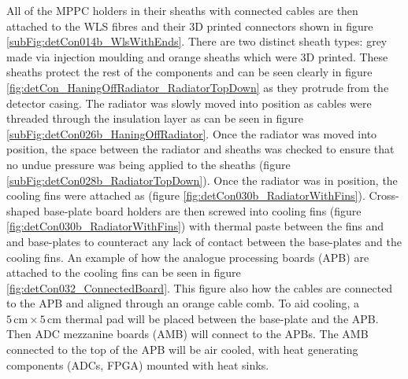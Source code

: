 
All of the MPPC holders in their sheaths with connected cables are then attached to the WLS fibres and their 3D printed connectors shown in figure \ref{subFig:detCon014b_WlsWithEnds}. There are two distinct sheath types: grey made via injection moulding and orange sheaths which were 3D printed. These sheaths protect the rest of the components and can be seen clearly in figure \ref{fig:detCon_HaningOffRadiator_RadiatorTopDown} as they protrude from the detector casing. The radiator was slowly moved into position as cables were threaded through the insulation layer as can be seen in figure \ref{subFig:detCon026b_HaningOffRadiator}. Once the radiator was moved into position, the space between the radiator and sheaths was checked to ensure that no undue pressure was being applied to the sheaths (figure \ref{subFig:detCon028b_RadiatorTopDown}). Once the radiator was in position, the cooling fins were  attached as (figure \ref{fig:detCon030b_RadiatorWithFins}). Cross-shaped base-plate board holders are then screwed into cooling fins (figure \ref{fig:detCon030b_RadiatorWithFins}) with thermal paste between the fins and and base-plates to counteract any lack of contact between the base-plates and the cooling fins. An example of how the analogue processing boards (APB) are attached to the cooling fins can be seen in figure \ref{fig:detCon032_ConnectedBoard}. This figure also how the cables are connected to the APB and aligned through an orange cable comb. To aid cooling, a $5\,\textrm{cm}\times5\,\textrm{cm}$ thermal pad will be placed between the base-plate and the APB. Then ADC mezzanine boards (AMB) will connect to the APBs. The AMB connected to the top of the APB will be air cooled, with heat generating components (ADCs, FPGA) mounted with heat sinks.

